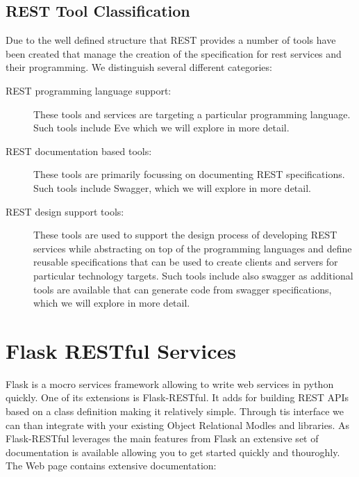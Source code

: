  
\subsection{REST Tool Classification}

Due to the well defined structure that REST provides a number of tools
have been created that manage the creation of the specification for
rest services and their programming. We distinguish several different
categories:

\begin{description}
\item[REST programming language support:] These tools and services are
targeting a particular programming language. Such tools include Eve
which we will explore in more detail.

\item[REST documentation based tools:] These tools are primarily
  focussing on documenting REST specifications. Such tools include
  Swagger, which we will explore in more detail.

\item[REST design support tools:] These tools are used to support the
  design process of developing REST services while abstracting on top
  of the programming languages and define reusable specifications that
  can be used to create clients and servers for particular technology
  targets. Such tools include also swagger as additional tools are
  available that can generate code from swagger specifications, which
  we will explore in more detail.
\end{description}


\section{Flask RESTful Services}
\label{s:rest-flask}


Flask is a mocro services framework allowing to write web services in
python quickly. One of its extensions is Flask-RESTful. It adds for 
building REST APIs based on a class definition making it relatively
simple. Through tis interface we can than integrate with
your existing Object Relational Modles and libraries. As Flask-RESTful
leverages the main features from Flask an extensive set of
documentation is available allowing you to get started quickly and
thouroghly. The Web page contains extensive documentation:


